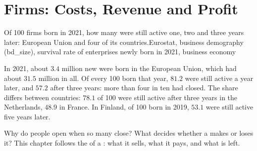\chapter{Firms: Costs, Revenue and Profit}\label{ch:g7:firms}

\begin{openingchart}{Of 100 firms born in 2021, how many were still active one, two and
three years later: European Union and four of its countries.}{Eurostat, business
demography (bd\_size), survival rate of enterprises newly born in 2021, business economy}
\end{openingchart}

In 2021, about $3.4$ million new  were born in the European Union, which had about
$31.5$ million  in all. Of every 100  born that year, $81.2$ were still active a year later, and $57.2$ after three
years: more than four in ten had closed. The share differs between countries: $78.1$ of
100 were still active after three years in the Netherlands, $48.9$ in France. In Finland,
of 100  born in 2019, $53.1$ were still active five years later.

Why do people open  when so many close? What decides whether a  makes  or
loses it? This chapter follows the  of a : what it sells, what it pays, and what
is left.


